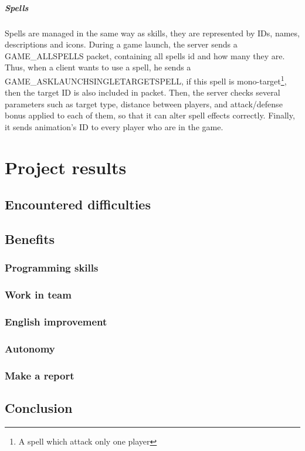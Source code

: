 \documentclass{scrreprt}
\begin{document}
		\subsubsection{Spells}
		Spells are managed in the same way as skills, they are represented by IDs, names, descriptions and icons. During a game launch, the server sends a GAME\_ALLSPELLS packet, containing all spells id and how many they are. Thus, when a client wants to use a spell, he sends a GAME\_ASKLAUNCHSINGLETARGETSPELL, if this spell is mono-target\footnote{A spell which attack only one player}, then the target ID is also included in packet. Then, the server checks several parameters such as target type, distance between players, and attack/defense bonus applied to each of them, so that it can alter spell effects correctly. Finally, it sends animation's ID to every player who are in the game.


		\part{Project results}
		\chapter{Encountered difficulties}
		\chapter{Benefits}
		\section{Programming skills}
		\section{Work in team}
		\section{English improvement}
		\section{Autonomy}
		\section{Make a report}

		\chapter*{Conclusion} %
		
\end{document}
